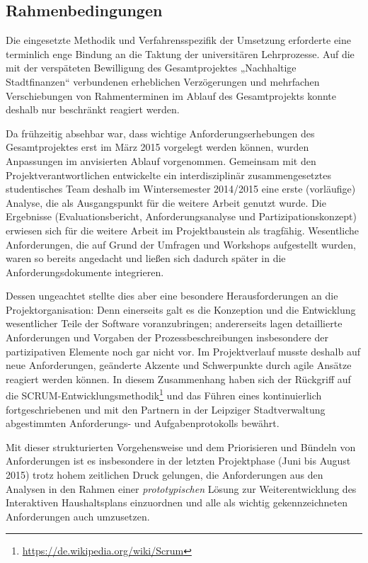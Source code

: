 \documentclass[11pt,a4paper,twoside]{article}
\begin{document}
\subsection{Rahmenbedingungen} 

Die eingesetzte Methodik und Verfahrensspezifik der Umsetzung erforderte eine
terminlich enge Bindung an die Taktung der universitären Lehrprozesse.  Auf
die mit der verspäteten Bewilligung des Gesamtprojektes „Nachhaltige
Stadtfinanzen“ verbundenen erheblichen Verzögerungen und mehrfachen
Verschiebungen von Rahmenterminen im Ablauf des Gesamtprojekts konnte deshalb
nur beschränkt reagiert werden. 

Da frühzeitig absehbar war, dass wichtige Anforderungserhebungen des
Gesamtprojektes erst im März 2015 vorgelegt werden können, wurden Anpassungen
im anvisierten Ablauf vorgenommen. Gemeinsam mit den Projektverantwortlichen
entwickelte ein interdisziplinär zusammengesetztes studentisches Team deshalb
im Wintersemester 2014/2015 eine erste (vorläufige) Analyse, die als
Ausgangspunkt für die weitere Arbeit genutzt wurde. Die Ergebnisse
(Evaluationsbericht, Anforderungsanalyse und Partizipationskonzept) erwiesen
sich für die weitere Arbeit im Projektbaustein als tragfähig. Wesentliche
Anforderungen, die auf Grund der Umfragen und Workshops aufgestellt wurden,
waren so bereits angedacht und ließen sich dadurch später in die
Anforderungsdokumente integrieren.

Dessen ungeachtet stellte dies aber eine besondere Herausforderungen an die
Projektorganisation: Denn einerseits galt es die Konzeption und die
Entwicklung wesentlicher Teile der Software voranzubringen; andererseits lagen
detaillierte Anforderungen und Vorgaben der Prozessbeschreibungen insbesondere
der partizipativen Elemente noch gar nicht vor. Im Projektverlauf musste
deshalb auf neue Anforderungen, geänderte Akzente und Schwerpunkte durch agile
Ansätze reagiert werden können. In diesem Zusammenhang haben sich der
Rückgriff auf die
SCRUM-Entwicklungsmethodik\footnote{\url{https://de.wikipedia.org/wiki/Scrum}}
und das Führen eines kontinuierlich fortgeschriebenen und mit den Partnern in
der Leipziger Stadtverwaltung abgestimmten Anforderungs- und
Aufgabenprotokolls bewährt.

Mit dieser strukturierten Vorgehensweise und dem Priorisieren und Bündeln von
Anforderungen ist es insbesondere in der letzten Projektphase (Juni bis August
2015) trotz hohem zeitlichen Druck gelungen, die Anforderungen aus den
Analysen in den Rahmen einer \emph{prototypischen} Lösung zur
Weiterentwicklung des Interaktiven Haushaltsplans einzuordnen und alle als
wichtig gekennzeichneten Anforderungen auch umzusetzen.
\end{document}
